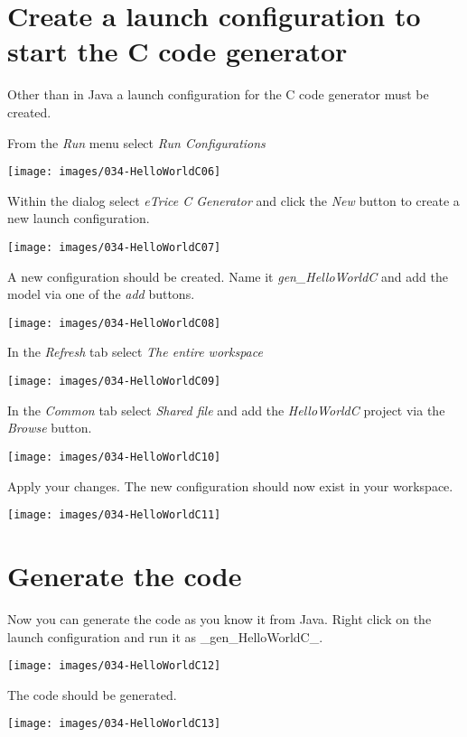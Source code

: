 \section{Create a launch configuration to start the C code generator}

Other than in Java a launch configuration for the C code generator must be created.

From the \textit{Run} menu select \textit{Run Configurations}

\texttt{[image: images/034-HelloWorldC06]}

Within the dialog select \textit{eTrice C Generator} and click the \textit{New} button to create a new launch configuration.

\texttt{[image: images/034-HelloWorldC07]}

A new configuration should be created. Name it \textit{gen\_HelloWorldC} and add the model via one of the \textit{add} buttons.

\texttt{[image: images/034-HelloWorldC08]}

In the \textit{Refresh} tab select \textit{The entire workspace} 

\texttt{[image: images/034-HelloWorldC09]}

In the \textit{Common} tab select \textit{Shared file} and add the \textit{HelloWorldC} project via the \textit{Browse} button.

\texttt{[image: images/034-HelloWorldC10]}

Apply your changes. The new configuration should now exist in your workspace.

\texttt{[image: images/034-HelloWorldC11]}


\section{Generate the code}

Now you can generate the code as you know it from Java. Right click on the launch configuration and run it as _gen_HelloWorldC_.

\texttt{[image: images/034-HelloWorldC12]}

The code should be generated.

\texttt{[image: images/034-HelloWorldC13]}


